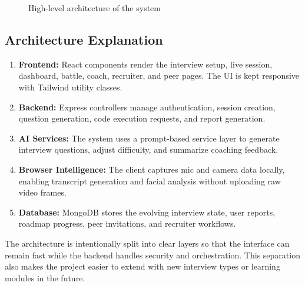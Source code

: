 ﻿\documentclass[12pt,a4paper]{article}
\begin{document}
\begin{figure}[H]
{%
}
\caption{High-level architecture of the system}
\end{figure}

\subsection{Architecture Explanation}
\begin{enumerate}
  \item \textbf{Frontend:} React components render the interview setup, live session, dashboard, battle, coach, recruiter, and peer pages. The UI is kept responsive with Tailwind utility classes.
  \item \textbf{Backend:} Express controllers manage authentication, session creation, question generation, code execution requests, and report generation.
  \item \textbf{AI Services:} The system uses a prompt-based service layer to generate interview questions, adjust difficulty, and summarize coaching feedback.
  \item \textbf{Browser Intelligence:} The client captures mic and camera data locally, enabling transcript generation and facial analysis without uploading raw video frames.
  \item \textbf{Database:} MongoDB stores the evolving interview state, user reports, roadmap progress, peer invitations, and recruiter workflows.
\end{enumerate}

The architecture is intentionally split into clear layers so that the interface can remain fast while the backend handles security and orchestration. This separation also makes the project easier to extend with new interview types or learning modules in the future.
\end{document}
